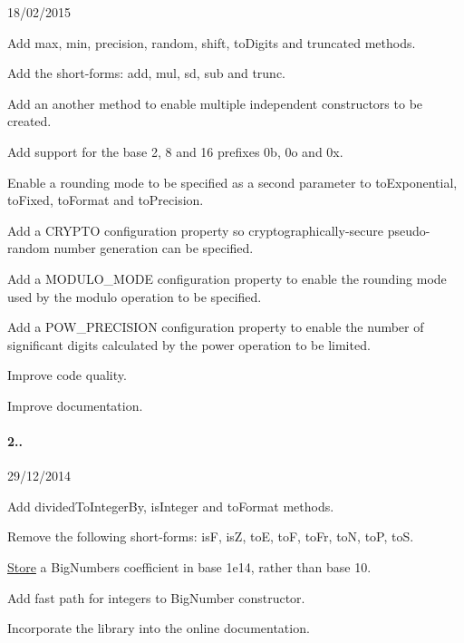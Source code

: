 \begin{DoxyItemize}
\item 18/02/2015
\item Add {\ttfamily max}, {\ttfamily min}, {\ttfamily precision}, {\ttfamily random}, {\ttfamily shift}, {\ttfamily to\+Digits} and {\ttfamily truncated} methods.
\item Add the short-\/forms\+: {\ttfamily add}, {\ttfamily mul}, {\ttfamily sd}, {\ttfamily sub} and {\ttfamily trunc}.
\item Add an {\ttfamily another} method to enable multiple independent constructors to be created.
\item Add support for the base 2, 8 and 16 prefixes {\ttfamily 0b}, {\ttfamily 0o} and {\ttfamily 0x}.
\item Enable a rounding mode to be specified as a second parameter to {\ttfamily to\+Exponential}, {\ttfamily to\+Fixed}, {\ttfamily to\+Format} and {\ttfamily to\+Precision}.
\item Add a {\ttfamily C\+R\+Y\+P\+T\+O} configuration property so cryptographically-\/secure pseudo-\/random number generation can be specified.
\item Add a {\ttfamily M\+O\+D\+U\+L\+O\+\_\+\+M\+O\+D\+E} configuration property to enable the rounding mode used by the {\ttfamily modulo} operation to be specified.
\item Add a {\ttfamily P\+O\+W\+\_\+\+P\+R\+E\+C\+I\+S\+I\+O\+N} configuration property to enable the number of significant digits calculated by the power operation to be limited.
\item Improve code quality.
\item Improve documentation.
\end{DoxyItemize}

\paragraph*{2..}


\begin{DoxyItemize}
\item 29/12/2014
\item Add {\ttfamily divided\+To\+Integer\+By}, {\ttfamily is\+Integer} and {\ttfamily to\+Format} methods.
\item Remove the following short-\/forms\+: {\ttfamily is\+F}, {\ttfamily is\+Z}, {\ttfamily to\+E}, {\ttfamily to\+F}, {\ttfamily to\+Fr}, {\ttfamily to\+N}, {\ttfamily to\+P}, {\ttfamily to\+S}.
\item \hyperlink{class_store}{Store} a Big\+Number\textquotesingle{}s coefficient in base 1e14, rather than base 10.
\item Add fast path for integers to Big\+Number constructor.
\item Incorporate the library into the online documentation.
\end{DoxyItemize}

